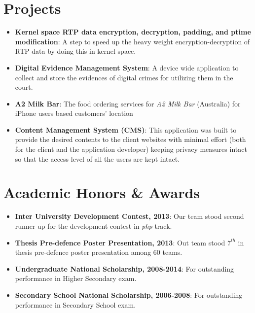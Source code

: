 \documentclass[letterpaper,11pt]{article}
\newcommand{\resumeItem}[2]{
  \item\small{
    \textbf{#1}{: #2 \vspace{-2pt}}
  }
}
\newcommand{\resumeSubItem}[2]{\resumeItem{#1}{#2}\vspace{-4pt}}
\newcommand{\resumeSubHeadingListStart}{\begin{itemize}[leftmargin=*]}
\newcommand{\resumeSubHeadingListEnd}{\end{itemize}}
\begin{document}
\section{Projects}
    \resumeSubHeadingListStart
        \resumeSubItem
            {Kernel space RTP data encryption, decryption, padding, and ptime modification}
            {A step to speed up the heavy weight encryption-decryption of RTP data by doing this in kernel space.}%
        \resumeSubItem
            {Digital Evidence Management System}
            {A device wide application to collect and store the evidences of digital crimes for utilizing them in the court.}%
        \resumeSubItem
            {A2 Milk Bar}
            {The food ordering services for \textit{A2 Milk Bar} (Australia) for iPhone users based customers’ location}%
        \resumeSubItem
            {Content Management System (CMS)}
            {This application was built to provide the desired contents to the client websites with minimal effort (both for the client and the application developer) keeping privacy measures intact so that the access level of all the users are kept intact.}%
        
    \resumeSubHeadingListEnd
    
\section{Academic Honors \& Awards}
    \resumeSubHeadingListStart
        \resumeSubItem
            {Inter University Development Contest, 2013}
            {Our team stood second runner up for the development contest in \textit{php} track.}
        \resumeSubItem
            {Thesis Pre-defence Poster Presentation, 2013}
            {Out team stood $7^{th}$ in thesis pre-defence poster presentation among 60 teams.}
        \resumeSubItem
            {Undergraduate National Scholarship, 2008-2014}
            {For outstanding performance in Higher Secondary exam.}
        \resumeSubItem
            {Secondary School National Scholarship, 2006-2008}
            {For outstanding performance in Secondary School exam.}
    \resumeSubHeadingListEnd
    
\end{document}
